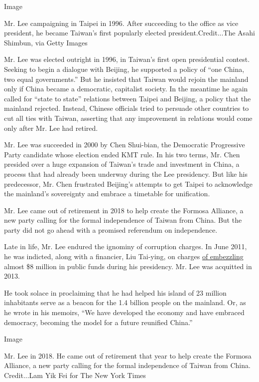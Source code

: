 Image

Mr. Lee campaigning in Taipei in 1996. After succeeding to the office as
vice president, he became Taiwan's first popularly elected
president.Credit...The Asahi Shimbun, via Getty Images

Mr. Lee was elected outright in 1996, in Taiwan's first open
presidential contest. Seeking to begin a dialogue with Beijing, he
supported a policy of ``one China, two equal governments.'' But he
insisted that Taiwan would rejoin the mainland only if China became a
democratic, capitalist society. In the meantime he again called for
``state to state'' relations between Taipei and Beijing, a policy that
the mainland rejected. Instead, Chinese officials tried to persuade
other countries to cut all ties with Taiwan, asserting that any
improvement in relations would come only after Mr. Lee had retired.

Mr. Lee was succeeded in 2000 by Chen Shui-bian, the Democratic
Progressive Party candidate whose election ended KMT rule. In his two
terms, Mr. Chen presided over a huge expansion of Taiwan's trade and
investment in China, a process that had already been underway during the
Lee presidency. But like his predecessor, Mr. Chen frustrated Beijing's
attempts to get Taipei to acknowledge the mainland's sovereignty and
embrace a timetable for unification.

Mr. Lee came out of retirement in 2018 to help create the Formosa
Alliance, a new party calling for the formal independence of Taiwan from
China. But the party did not go ahead with a promised referendum on
independence.

Late in life, Mr. Lee endured the ignominy of corruption charges. In
June 2011, he was indicted, along with a financier, Liu Tai-ying, on
charges
\href{https://www.nytimes.com/2011/07/01/world/asia/01taiwan.html}{of
embezzling} almost \$8 million in public funds during his presidency.
Mr. Lee was acquitted in 2013.

He took solace in proclaiming that he had helped his island of 23
million inhabitants serve as a beacon for the 1.4 billion people on the
mainland. Or, as he wrote in his memoirs, ``We have developed the
economy and have embraced democracy, becoming the model for a future
reunified China.''

Image

Mr. Lee in 2018. He came out of retirement that year to help create the
Formosa Alliance, a new party calling for the formal independence of
Taiwan from China. Credit...Lam Yik Fei for The New York Times

